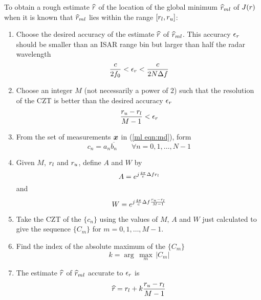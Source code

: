 \begin{algorithm}
\label{ee alg:min using CZT}\mbox{}\par

To obtain a rough estimate $\widehat{r}$ of the location of the global minimum
$\widehat{r}_{ml}$ of $J({r})$ when it is known that $\widehat{r}_{ml}$ lies within the range
$[{r}_l,{r}_u]$:
\begin{enumerate}
\item Choose the desired accuracy of the estimate $\widehat{r}$ of $\widehat{r}_{ml}$. This
accuracy $\epsilon_{{r}}$ should be smaller than an ISAR range bin but
larger than half the radar wavelength
\begin{equation}
\frac{c}{2 f_0} < \epsilon_{{r}} < \frac{c}{2 N \Delta f}
\end{equation}

\item Choose an integer $M$ (not necessarily a power of $2$) such that the 
resolution of the CZT is better than the desired accuracy $\epsilon_{{r}}$
\begin{equation}
\frac{{r}_u-{r}_l}{M-1}<\epsilon_{{r}}
\end{equation}

\item From the set of measurements $\bm{x}$ in (\ref{ml eqn:md}), form 
\begin{equation}
c_n=a_n\overline{b_n}\qquad\forall n=0,1,\ldots, N-1
\end{equation}

\item Given $M$, ${r}_l$ and ${r}_u$, define $A$ and $W$ by
\begin{equation}
A={e^{j\frac{4\pi}{c}\Delta f {r}_l}}
\end{equation}
and
\begin{equation}
W={e^{j\frac{4\pi}{c}\Delta f \frac{{r}_u-{r}_l}{M-1}}}
\end{equation}

\item Take the CZT of the $\{c_n\}$ using the values of $M$, $A$ and $W$
just calculated to give the sequence $\{C_m\}$ for $m=0,1,\ldots, M-1$.

\item Find the index of the absolute maximum of the $\{C_m\}$
\begin{equation}
k=\arg\,\max_m\,\left|C_m\right|
\end{equation}

\item The estimate $\widehat{r}$ of $\widehat{r}_{ml}$ accurate to $\epsilon_{{r}}$ is
\begin{equation}
\widehat{r}= {r}_l+k\frac{{r}_u-{r}_l}{M-1}
\end{equation}
\end{enumerate}
\end{algorithm}

